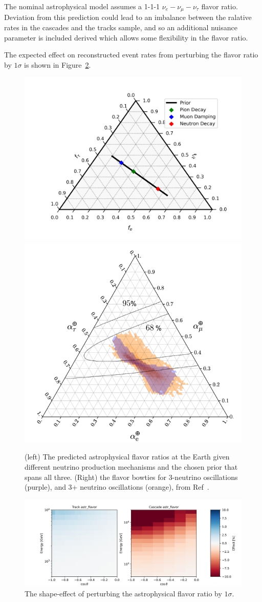 \documentclass[main.tex]{subfiles}
\begin{document}
The nominal astrophysical model assumes a 1-1-1 $\nu_{e}-\nu_{\mu}-\nu_{\tau}$ flavor ratio. 
Deviation from this prediction could lead to an imbalance between the ralative rates in the cascades and the tracks sample, and so an additional nuisance parameter is included derived which allows some flexibility in the flavor ratio. 


The expected effect on reconstructed event rates from perturbing the flavor ratio by $1\sigma$ is shown in Figure~\ref{fig:astr_flavor_effect}. 


\begin{figure}
    \centering
    \includegraphics[width=0.55\linewidth]{figures/test_flavor_plot.png}%
    \includegraphics[width=0.40\linewidth]{figures/bowtie.png}
    \caption{(left) The predicted astrophysical flavor ratios at the Earth given different neutrino production mechanisms and the chosen prior that spans all three. (Right) the flavor bowties for 3-neutrino oscillations (purple), and 3+ neutrino oscillations (orange), from Ref~\cite{Arg_elles_2020_astrotime}.}\label{fig:flavor_triangle_points}
\end{figure}

\begin{figure}
    \centering
    \includegraphics[width=0.7\linewidth]{figures/systematics/astr_flavor.png}
    \caption{The shape-effect of perturbing the astrophysical flavor ratio by $1\sigma$.}\label{fig:astr_flavor_effect}
\end{figure}
\end{document}
